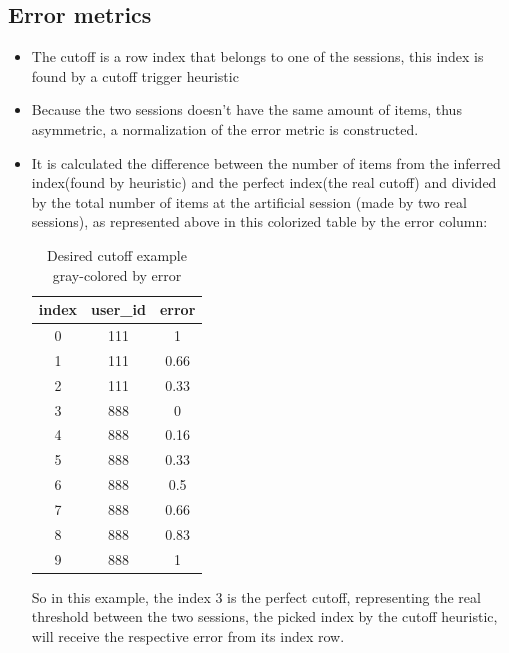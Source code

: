 \documentclass[ecp,tc,english]{iiufrgs}
\begin{document}
        \subsection{Error metrics}
        \begin{itemize}
            \item The cutoff is a row index that belongs to one of the sessions, this index is found by a cutoff trigger heuristic
            \item Because the two sessions doesn't have the same amount of items, thus asymmetric, a normalization of the error metric is constructed.
            \item It is calculated the difference between the number of items from the inferred index(found by heuristic) and the perfect index(the real cutoff) and divided by the total number of items at the artificial session (made by two real sessions), as represented above in this colorized table by the error column:
            
            \begin{table}[!ht]
                \centering
                \begin{tabular}{c|c|c}
                    \hline
                    \rowcolor[RGB]{239,239,239}
                    index & user\_id & error \\
                    \hline 
                    \rowcolor[RGB]{140,140,140}
                    0 & 111 & 1 \\ 
                    \rowcolor[RGB]{197,197,197}
                    1 & 111 & 0.66 \\ 
                    \rowcolor[RGB]{226,226,226}
                    2 & 111 & 0.33 \\ 
                    \rowcolor[RGB]{255,255,255}
                    3 & 888 & 0 \\ 
                    \rowcolor[RGB]{239,239,239}
                    4 & 888 & 0.16 \\ 
                    \rowcolor[RGB]{222,222,222}
                    5 & 888 & 0.33 \\ 
                    \rowcolor[RGB]{206,206,206}
                    6 & 888 & 0.5 \\ 
                    \rowcolor[RGB]{189,189,189}
                    7 & 888 & 0.66 \\ 
                    \rowcolor[RGB]{173,173,173}
                    8 & 888 & 0.83 \\ 
                    \rowcolor[RGB]{140,140,140}
                    9 & 888 & 1 \\ 
                    \hline
                \end{tabular}
                \caption{Desired cutoff example gray-colored by error}
                \label{tab:my_label}
            \end{table}
            
            So in this example, the index 3 is the perfect cutoff, representing the real threshold between the two sessions, the picked index by the cutoff heuristic, will receive the respective error from its index row.
        \end{itemize} 
        
\end{document}
